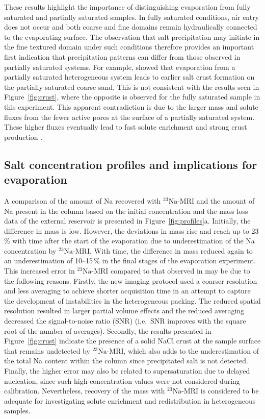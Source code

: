 \documentclass[final]{agujournal2019}
\newcommand{\NaIso}{\ensuremath{^{23}\mathrm{Na}}}
\begin{document}
These results highlight the importance of distinguishing evaporation from fully
saturated and partially saturated samples. In fully saturated conditions, air
entry does not occur and both coarse and fine domains remain hydraulically
connected to the evaporating surface. The observation that salt precipitation may
initiate in the fine textured domain under such conditions therefore provides an
important first indication that precipitation patterns can differ from those
observed in partially saturated systems. For example, 
showed that evaporation from a partially saturated heterogeneous system leads to
earlier salt crust formation on the partially saturated coarse sand. This is not
consistent with the results seen in Figure~\ref{fig:crust}, where the opposite is
observed for the fully saturated sample in this experiment. This apparent
contradiction is due to the larger mass and solute fluxes from the fewer active
pores at the surface of a partially saturated system. These higher fluxes
eventually lead to fast solute enrichment and strong crust production
\cite{norouzirad2013,shokri2014,shokrikuehni2020}.

\subsection{Salt concentration profiles and implications for evaporation}
\label{sec:profiles}

A comparison of the amount of Na recovered with \NaIso-MRI and the amount of Na
present in the column based on the initial concentration and the mass loss data
of the external reservoir is presented in Figure~\ref{fig:profiles}a. Initially,
the difference in mass is low. However, the deviations in mass rise and reach up
to 23\,\% with time after the start of the evaporation due to underestimation of
the Na concentration by \NaIso-MRI. With time, the difference in mass reduced
again to an underestimation of 10--15\,\% in the final stages of the evaporation
experiment. This increased error in \NaIso-MRI compared to that observed in
 may be due to the following reasons. Firstly, the new
imaging protocol used a coarser resolution and less averaging to achieve shorter
acquisition time in an attempt to capture the development of instabilities in the
heterogeneous packing. The reduced spatial resolution resulted in larger partial
volume effects and the reduced averaging decreased the signal-to-noise ratio
(SNR) (i.e.\ SNR improves with the square root of the number of averages).
Secondly, the results presented in Figure~\ref{fig:crust} indicate the presence
of a solid NaCl crust at the sample surface that remains undetected by
\NaIso-MRI, which also adds to the underestimation of the total Na content within
the column since precipitated salt is not detected. Finally, the higher error may
also be related to supersaturation due to delayed nucleation, since such high
concentration values were not considered during calibration. Nevertheless,
recovery of the mass with \NaIso-MRI is considered to be adequate for
investigating solute enrichment and redistribution in heterogeneous samples.
\end{document}
